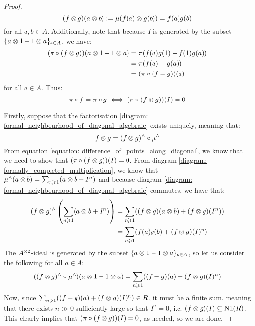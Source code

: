 \begin{proof}
                    $$(f \tensor g)(a \tensor b) := \mu( f(a) \tensor g(b) ) = f(a) g(b)$$
                for all $a, b \in A$. Additionally, note that because $I$ is generated by the subset $\{a \tensor 1 - 1 \tensor a\}_{a \in A}$, we have:
                    \begin{equation} \label{equation: difference_of_points_along_diagonal}
                        \begin{aligned}
                            (\pi \circ (f \tensor g))(a \tensor 1 - 1 \tensor a) & = \pi(f(a) g(1) - f(1) g(a))
                            \\
                            & = \pi(f(a) - g(a))
                            \\
                            & = (\pi \circ (f - g))(a)
                        \end{aligned}
                    \end{equation}
                for all $a \in A$. Thus:
                    $$\pi \circ f = \pi \circ g \iff (\pi \circ (f \tensor g) )(I) = 0$$

                Firstly, suppose that the factorisation \eqref{diagram: formal_neighbourhood_of_diagonal_algebraic} exists uniquely, meaning that:
                    $$f \tensor g = (f \tensor g)^{\wedge} \circ \mu^{\wedge}$$
                From equation \eqref{equation: difference_of_points_along_diagonal}, we know that we need to show that $(\pi \circ (f \tensor g) )(I) = 0$. From diagram \eqref{diagram: formally_completed_multiplication}, we know that $\mu^{\wedge}(a \tensor b) = \sum_{n \geq 1} ( a \tensor b + I^n )$ and because diagram \eqref{diagram: formal_neighbourhood_of_diagonal_algebraic} commutes, we have that:
                    $$
                        \begin{aligned}
                            (f \tensor g)^{\wedge}\left( \sum_{n \geq 1} ( a \tensor b + I^n ) \right) & = \sum_{n \geq 1} ( (f \tensor g)(a \tensor b) + (f \tensor g)(I^n) )
                            \\
                            & = \sum_{n \geq 1} ( f(a) g(b) + (f \tensor g)(I)^n )
                        \end{aligned}
                    $$
                The $A^{\tensor 2}$-ideal is generated by the subset $\{a \tensor 1 - 1 \tensor a\}_{a \in A}$, so let us consider the following for all $a \in A$:
                    $$((f \tensor g)^{\wedge} \circ \mu^{\wedge})(a \tensor 1 - 1 \tensor a) = \sum_{n \geq 1} ( (f - g)(a) + (f \tensor g)(I)^n )$$
                Now, since $\sum_{n \geq 1} ((f - g)(a) + (f \tensor g)(I)^n) \in R$, it must be a finite sum, meaning that there exists $n \gg 0$ sufficiently large so that $I^n = 0$, i.e. $(f \tensor g)(I) \subseteq \Nil(R)$. This clearly implies that $(\pi \circ (f \tensor g) )(I) = 0$, as needed, so we are done.


\end{proof}
